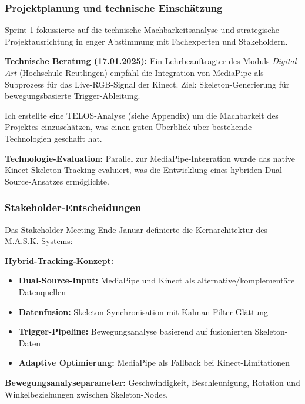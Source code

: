 \subsubsection{Projektplanung und technische Einschätzung}

Sprint 1 fokussierte auf die technische Machbarkeitsanalyse und strategische Projektausrichtung in enger Abstimmung mit Fachexperten und Stakeholdern.

\textbf{Technische Beratung (17.01.2025):}
Ein Lehrbeauftragter des Moduls \textit{Digital Art} (Hochschule Reutlingen) empfahl die Integration von MediaPipe als Subprozess für das Live-RGB-Signal der Kinect. Ziel: Skeleton-Generierung für bewegungsbasierte Trigger-Ableitung.

Ich erstellte eine TELOS-Analyse (siehe Appendix) um die Machbarkeit des Projektes einzuschätzen, was einen guten Überblick über bestehende Technologien geschafft hat.

\textbf{Technologie-Evaluation:}
Parallel zur MediaPipe-Integration wurde das native Kinect-Skeleton-Tracking evaluiert, was die Entwicklung eines hybriden Dual-Source-Ansatzes ermöglichte.

\subsubsection{Stakeholder-Entscheidungen}

Das Stakeholder-Meeting Ende Januar definierte die Kernarchitektur des M.A.S.K.-Systems:

\textbf{Hybrid-Tracking-Konzept:}
\begin{itemize}
    \item \textbf{Dual-Source-Input:} MediaPipe und Kinect als alternative/komplementäre Datenquellen
    \item \textbf{Datenfusion:} Skeleton-Synchronisation mit Kalman-Filter-Glättung
    \item \textbf{Trigger-Pipeline:} Bewegungsanalyse basierend auf fusionierten Skeleton-Daten
    \item \textbf{Adaptive Optimierung:} MediaPipe als Fallback bei Kinect-Limitationen
\end{itemize}

\textbf{Bewegungsanalyseparameter:}
Geschwindigkeit, Beschleunigung, Rotation und Winkelbeziehungen zwischen Skeleton-Nodes.

